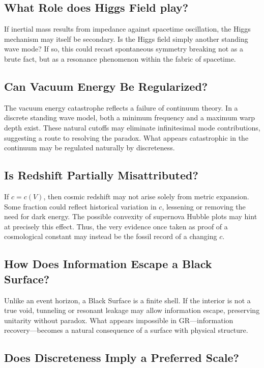 \documentclass[12pt]{article}
\begin{document}
\subsection{What Role does Higgs Field play?}

If inertial mass results from impedance against spacetime oscillation, the Higgs mechanism may itself be secondary. Is the Higgs field simply another standing wave mode? If so, this could recast spontaneous symmetry breaking not as a brute fact, but as a resonance phenomenon within the fabric of spacetime.

\subsection{Can Vacuum Energy Be Regularized?}

The vacuum energy catastrophe reflects a failure of continuum theory. In a discrete standing wave model, both a minimum frequency and a maximum warp depth exist. These natural cutoffs may eliminate infinitesimal mode contributions, suggesting a route to resolving the paradox. What appears catastrophic in the continuum may be regulated naturally by discreteness.

\subsection{Is Redshift Partially Misattributed?}

If $c = c(V)$, then cosmic redshift may not arise solely from metric expansion. Some fraction could reflect historical variation in $c$, lessening or removing the need for dark energy. The possible convexity of supernova Hubble plots may hint at precisely this effect. Thus, the very evidence once taken as proof of a cosmological constant may instead be the fossil record of a changing $c$.

\subsection{How Does Information Escape a Black Surface?}

Unlike an event horizon, a Black Surface is a finite shell. If the interior is not a true void, tunneling or resonant leakage may allow information escape, preserving unitarity without paradox. What appears impossible in GR---information recovery---becomes a natural consequence of a surface with physical structure.

\subsection{Does Discreteness Imply a Preferred Scale?}
\end{document}
